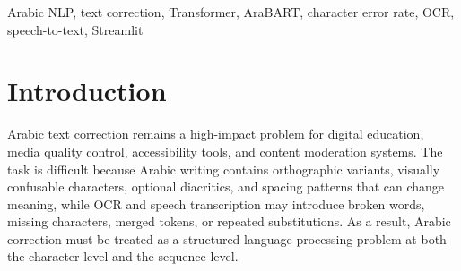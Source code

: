 \documentclass[conference]{IEEEtran}
\begin{document}
\begin{abstract}
Arabic text correction is a hard problem in Arabic natural language processing because the language has many spelling variants, visually similar characters, and inconsistent forms in real data sources such as OCR, speech transcription, and noisy user input. In this setting, even small character-level errors can change meaning, break token boundaries, or reduce grammatical fluency, so correction is more than simple spelling cleanup. This paper presents an end-to-end correction framework with two complementary modes: a lightweight character-level encoder-decoder Transformer trained on synthetic noisy-clean Arabic pairs, and a deployment-oriented correction service built on the pre-trained CAMeL-Lab AraBART model in a Streamlit application. The custom model is evaluated on an in-domain held-out synthetic test split and reaches 0.0364 CER, while the AraBART-based system is evaluated in a zero-shot deployment setting and provides stronger grammatical fluency and broader usability across manual text, files, OCR images, audio, and live speech. Rather than claiming one direct winner, the study analyzes the trade-off between in-domain character-level accuracy and real-world multi-modal robustness. The main contribution is a reproducible Arabic text-correction workflow that combines data curation, normalization, controlled noise synthesis, model training, error analysis, and user-facing deployment.
\end{abstract}

\begin{IEEEkeywords}
Arabic NLP, text correction, Transformer, AraBART, character error rate, OCR, speech-to-text, Streamlit
\end{IEEEkeywords}

\section{Introduction}
Arabic text correction remains a high-impact problem for digital education, media quality control, accessibility tools, and content moderation systems. The task is difficult because Arabic writing contains orthographic variants, visually confusable characters, optional diacritics, and spacing patterns that can change meaning, while OCR and speech transcription may introduce broken words, missing characters, merged tokens, or repeated substitutions. As a result, Arabic correction must be treated as a structured language-processing problem at both the character level and the sequence level.
\end{document}
